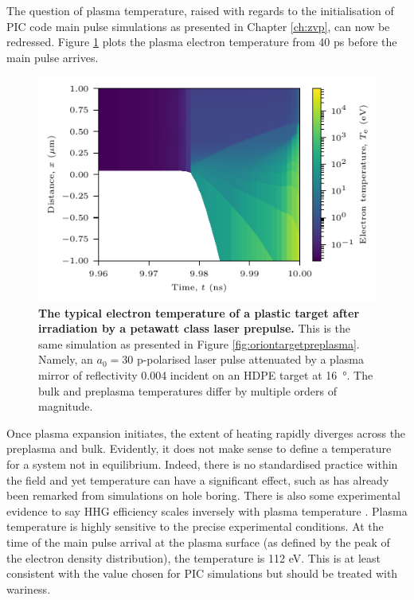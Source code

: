 The question of plasma temperature, raised with regards to the initialisation of PIC code main pulse simulations as presented in Chapter \ref{ch:zvp}, can now be redressed. Figure \ref{fig:oriontemperature} plots the plasma electron temperature from 40 ps before the main pulse arrives.
\begin{figure}
	\centering
	\includegraphics{figures/orion/orion_temperature}
	\caption[Typical electron temperature of a plastic target after irradiation by a petawatt class laser prepulse.]{\textbf{The typical electron temperature of a plastic target after irradiation by a petawatt class laser prepulse.} This is the same simulation as presented in Figure \ref{fig:oriontargetpreplasma}. Namely, an $a_0 = 30$ p-polarised laser pulse attenuated by a plasma mirror of reflectivity 0.004 incident on an HDPE target at \qty{16}{\degree}. The bulk and preplasma temperatures differ by multiple orders of magnitude.}
	\label{fig:oriontemperature}
\end{figure}
Once plasma expansion initiates, the extent of heating rapidly diverges across the preplasma and bulk. Evidently, it does not make sense to define a temperature for a system not in equilibrium. Indeed, there is no standardised practice within the field and yet temperature can have a significant effect, such as has already been remarked from simulations on hole boring. There is also some experimental evidence to say HHG efficiency scales inversely with plasma temperature \cite{kahalyDirectObservationDensityGradient2013}. Plasma temperature is highly sensitive to the precise experimental conditions. At the time of the main pulse arrival at the plasma surface (as defined by the peak of the electron density distribution), the temperature is 112 eV. This is at least consistent with the value chosen for PIC simulations but should be treated with wariness. 

